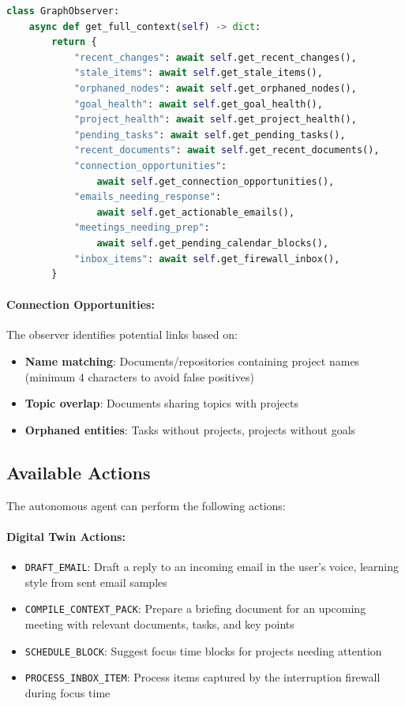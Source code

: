 \documentclass[11pt,a4paper]{article}
\begin{document}
\begin{lstlisting}[language=Python]
class GraphObserver:
    async def get_full_context(self) -> dict:
        return {
            "recent_changes": await self.get_recent_changes(),
            "stale_items": await self.get_stale_items(),
            "orphaned_nodes": await self.get_orphaned_nodes(),
            "goal_health": await self.get_goal_health(),
            "project_health": await self.get_project_health(),
            "pending_tasks": await self.get_pending_tasks(),
            "recent_documents": await self.get_recent_documents(),
            "connection_opportunities":
                await self.get_connection_opportunities(),
            "emails_needing_response":
                await self.get_actionable_emails(),
            "meetings_needing_prep":
                await self.get_pending_calendar_blocks(),
            "inbox_items": await self.get_firewall_inbox(),
        }
\end{lstlisting}

\paragraph{Connection Opportunities:} The observer identifies potential links based on:
\begin{itemize}
    \item \textbf{Name matching}: Documents/repositories containing project names (minimum 4 characters to avoid false positives)
    \item \textbf{Topic overlap}: Documents sharing topics with projects
    \item \textbf{Orphaned entities}: Tasks without projects, projects without goals
\end{itemize}

\subsection{Available Actions}

The autonomous agent can perform the following actions:

\paragraph{Digital Twin Actions:}
\begin{itemize}
    \item \texttt{DRAFT\_EMAIL}: Draft a reply to an incoming email in the user's voice, learning style from sent email samples
    \item \texttt{COMPILE\_CONTEXT\_PACK}: Prepare a briefing document for an upcoming meeting with relevant documents, tasks, and key points
    \item \texttt{SCHEDULE\_BLOCK}: Suggest focus time blocks for projects needing attention
    \item \texttt{PROCESS\_INBOX\_ITEM}: Process items captured by the interruption firewall during focus time
\end{itemize}
\end{document}
